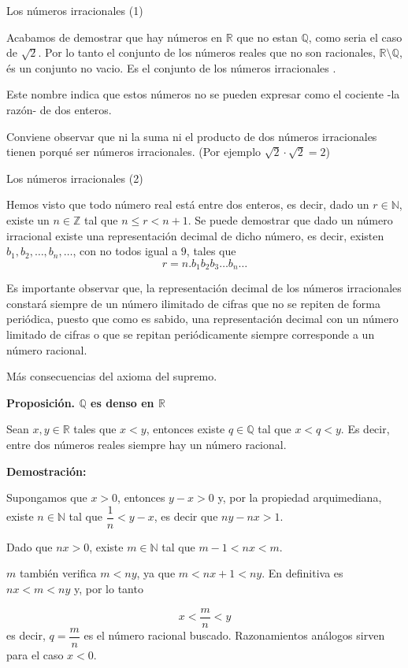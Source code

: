\documentclass[ignorenonframetext,]{beamer}
\begin{document}
\begin{frame}{Los números irracionales (1)}
\protect\hypertarget{los-nuxfameros-irracionales-1}{}

Acabamos de demostrar que hay números en \(\mathbb{R}\) que no estan
\(\mathbb{Q}\), como seria el caso de \(\sqrt{2}\). Por lo tanto el
conjunto de los números reales que no son racionales,
\(\mathbb{R} \setminus \mathbb{Q}\), és un conjunto no vacio. Es el
conjunto de los números irracionales .

Este nombre indica que estos números no se pueden expresar como el
cociente -la razón- de dos enteros.

Conviene observar que ni la suma ni el producto de dos números
irracionales tienen porqué ser números irracionales. (Por ejemplo
\(\sqrt{2} \cdot \sqrt{2} = 2\))

\end{frame}

\begin{frame}{Los números irracionales (2)}
\protect\hypertarget{los-nuxfameros-irracionales-2}{}

Hemos visto que todo número real está entre dos enteros, es decir, dado
un \(r \in \mathbb{N}\), existe un \(n \in \mathbb{Z}\) tal que
\(n \leq r < n+1\). Se puede demostrar que dado un número irracional
existe una representación decimal de dicho número, es decir, existen
\(b_1,b_2, \ldots, b_n, \ldots\), con no todos igual a \(9\), tales que
\[
r = n.b_1b_2b_3 \ldots b_n \ldots
\]

Es importante observar que, la representación decimal de los números
irracionales constará siempre de un número ilimitado de cifras que no se
repiten de forma periódica, puesto que como es sabido, una
representación decimal con un número limitado de cifras o que se repitan
periódicamente siempre corresponde a un número racional.

\end{frame}

\begin{frame}{Más consecuencias del axioma del supremo.}
\protect\hypertarget{muxe1s-consecuencias-del-axioma-del-supremo.}{}

\textbf{Proposición. \(\mathbb{Q}\) es denso en \(\mathbb{R}\)}

Sean \(x,y \in \mathbb{R}\) tales que \(x<y\), entonces existe
\(q \in \mathbb{Q}\) tal que \(x<q<y\). Es decir, entre dos números
reales siempre hay un número racional.

\textbf{Demostración:}

Supongamos que \(x>0\), entonces \(y-x >0\) y, por la propiedad
arquimediana, existe \(n \in \mathbb{N}\) tal que \(\dfrac{1}{n} <y-x\),
es decir que \(ny-nx >1\).

Dado que \(nx >0\), existe \(m \in \mathbb{N}\) tal que \(m-1 <nx<m\).

\(m\) también verifica \(m<ny\), ya que \(m< nx+1<ny\). En definitiva es
\(nx<m<ny\) y, por lo tanto

\[
x<\dfrac{m}{n}<y
\] es decir, \(q = \dfrac{m}{n}\) es el número racional buscado.
Razonamientos análogos sirven para el caso \(x<0\).

\end{frame}
\end{document}
